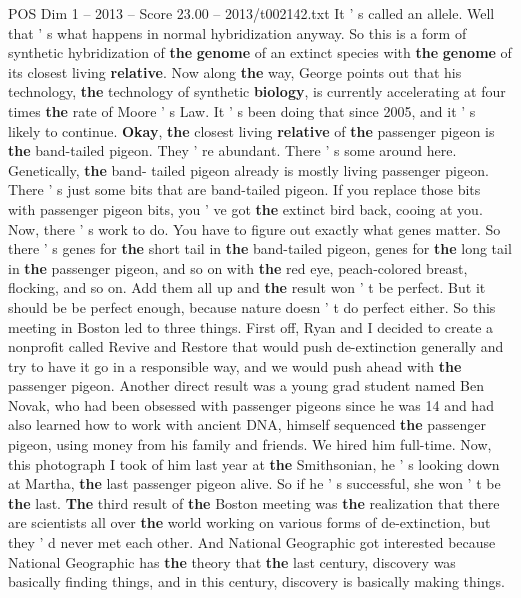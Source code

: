 \begin{textsample}{POS Dim 1 – 2013 – Score 23.00 – 2013/t002142.txt}
It ' s called an allele.
Well that ' s what happens in normal hybridization anyway.
So this is a form of synthetic hybridization of \textbf{the} \textbf{genome} of an extinct species with \textbf{the} \textbf{genome} of its closest living \textbf{relative}.
Now along \textbf{the} way, George points out that his technology, \textbf{the} technology of synthetic \textbf{biology}, is currently accelerating at four times \textbf{the} rate of Moore ' s Law.
It ' s been doing that since 2005, and it ' s likely to continue. \textbf{Okay}, \textbf{the} closest living \textbf{relative} of \textbf{the} passenger pigeon is \textbf{the} band-tailed pigeon.
They ' re abundant.
There ' s some around here.
Genetically, \textbf{the} band- tailed pigeon already is mostly living passenger pigeon.
There ' s just some bits that are band-tailed pigeon.
If you replace those bits with passenger pigeon bits, you ' ve got \textbf{the} extinct bird back, cooing at you.
Now, there ' s work to do.
You have to figure out exactly what genes matter.
So there ' s genes for \textbf{the} short tail in \textbf{the} band-tailed pigeon, genes for \textbf{the} long tail in \textbf{the} passenger pigeon, and so on with \textbf{the} red eye, peach-colored breast, flocking, and so on.
Add them all up and \textbf{the} result won ' t be perfect.
But it should be be perfect enough, because nature doesn ' t do perfect either.
So this meeting in Boston led to three things.
First off, Ryan and I decided to create a nonprofit called Revive and Restore that would push de-extinction generally and try to have it go in a responsible way, and we would push ahead with \textbf{the} passenger pigeon.
Another direct result was a young grad student named Ben Novak, who had been obsessed with passenger pigeons since he was 14 and had also learned how to work with ancient DNA, himself sequenced \textbf{the} passenger pigeon, using money from his family and friends.
We hired him full-time.
Now, this photograph I took of him last year at \textbf{the} Smithsonian, he ' s looking down at Martha, \textbf{the} last passenger pigeon alive.
So if he ' s successful, she won ' t be \textbf{the} last. \textbf{The} third result of \textbf{the} Boston meeting was \textbf{the} realization that there are scientists all over \textbf{the} world working on various forms of de-extinction, but they ' d never met each other.
And National Geographic got interested because National Geographic has \textbf{the} theory that \textbf{the} last century, discovery was basically finding things, and in this century, discovery is basically making things.

\end{textsample}
